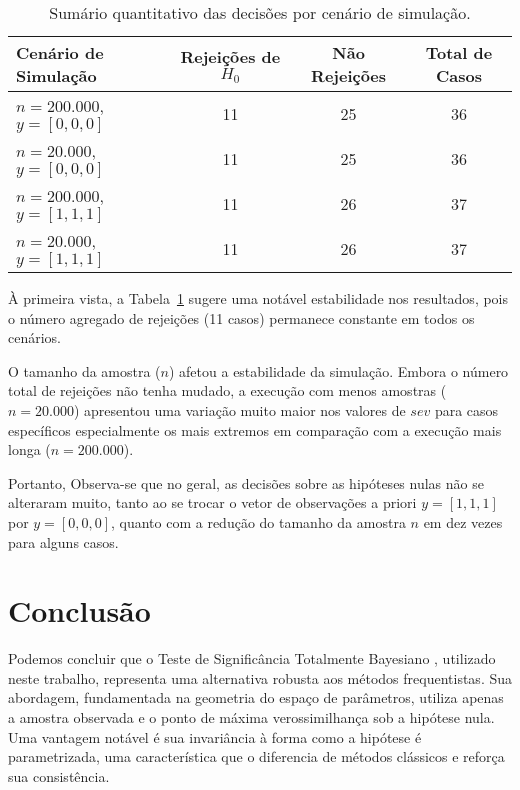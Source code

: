 \documentclass[12pt, a4paper]{article}
\begin{document}
\begin{table}[H]
    \centering
    \caption{Sumário quantitativo das decisões por cenário de simulação.}
    \label{tab:sumario_decisoes}
    \begin{tabular}{l|ccc}
        \toprule
        \textbf{Cenário de Simulação} & \textbf{Rejeições de $H_0$} & \textbf{Não Rejeições} & \textbf{Total de Casos} \\
        \midrule
        $n=200.000$, $y=[0,0,0]$ & 11 & 25 & 36 \\
        $n=20.000$,  $y=[0,0,0]$ & 11 & 25 & 36 \\
        \midrule
        $n=200.000$, $y=[1,1,1]$ & 11 & 26 & 37 \\
        $n=20.000$,  $y=[1,1,1]$ & 11 & 26 & 37 \\
        \bottomrule
    \end{tabular}
\end{table}







À primeira vista, a Tabela~\ref{tab:sumario_decisoes} sugere uma notável estabilidade nos resultados, pois o número agregado de rejeições (11 casos) permanece constante em todos os cenários. 

O tamanho da amostra ($n$) afetou a estabilidade da simulação. Embora o número total de rejeições não tenha mudado, a execução com menos amostras ($n=20.000$) apresentou uma variação muito maior nos valores de $sev$ para casos específicos especialmente os mais extremos em comparação com a execução mais longa ($n=200.000$).

Portanto, Observa-se que no geral, as decisões sobre as hipóteses nulas não se alteraram muito, tanto ao se trocar o vetor de observações a priori $y = [1, 1, 1]$ por $y = [0, 0, 0]$, quanto com a redução do tamanho da amostra $n$ em dez vezes para alguns casos.

\section{Conclusão}


Podemos concluir que o Teste de Significância Totalmente Bayesiano , utilizado neste trabalho, representa uma alternativa robusta aos métodos frequentistas. Sua abordagem, fundamentada na geometria do espaço de parâmetros, utiliza apenas a amostra observada e o ponto de máxima verossimilhança sob a hipótese nula. Uma vantagem notável é sua invariância à forma como a hipótese é parametrizada, uma característica que o diferencia de métodos clássicos e reforça sua consistência.
\end{document}
